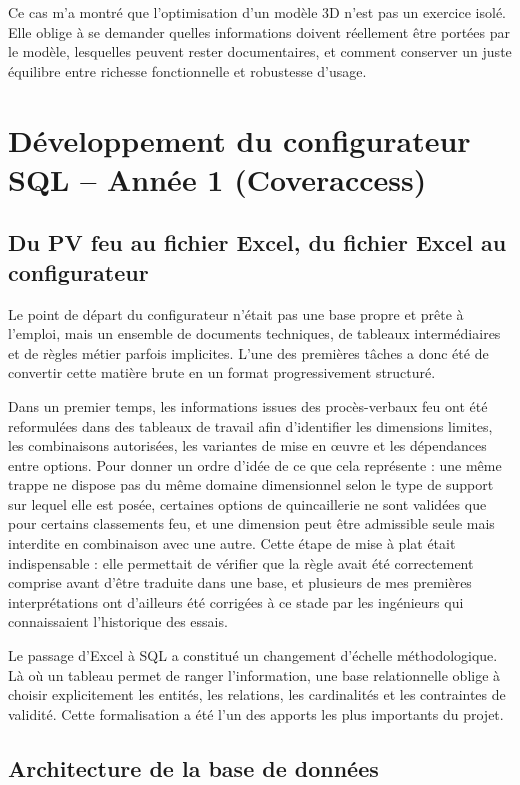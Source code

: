 Ce cas m'a montré que l'optimisation d'un modèle 3D n'est pas un exercice isolé. Elle oblige à se demander quelles informations doivent réellement être portées par le modèle, lesquelles peuvent rester documentaires, et comment conserver un juste équilibre entre richesse fonctionnelle et robustesse d'usage.

\section{Développement du configurateur SQL -- Année 1 (Coveraccess)}

\subsection{Du PV feu au fichier Excel, du fichier Excel au configurateur}

Le point de départ du configurateur n'était pas une base propre et prête à l'emploi, mais un ensemble de documents techniques, de tableaux intermédiaires et de règles métier parfois implicites. L'une des premières tâches a donc été de convertir cette matière brute en un format progressivement structuré.

Dans un premier temps, les informations issues des procès-verbaux feu ont été reformulées dans des tableaux de travail afin d'identifier les dimensions limites, les combinaisons autorisées, les variantes de mise en \oe uvre et les dépendances entre options. Pour donner un ordre d'idée de ce que cela représente : une même trappe ne dispose pas du même domaine dimensionnel selon le type de support sur lequel elle est posée, certaines options de quincaillerie ne sont validées que pour certains classements feu, et une dimension peut être admissible seule mais interdite en combinaison avec une autre. Cette étape de mise à plat était indispensable : elle permettait de vérifier que la règle avait été correctement comprise avant d'être traduite dans une base, et plusieurs de mes premières interprétations ont d'ailleurs été corrigées à ce stade par les ingénieurs qui connaissaient l'historique des essais.

Le passage d'Excel à SQL a constitué un changement d'échelle méthodologique. Là où un tableau permet de ranger l'information, une base relationnelle oblige à choisir explicitement les entités, les relations, les cardinalités et les contraintes de validité. Cette formalisation a été l'un des apports les plus importants du projet.

\subsection{Architecture de la base de données}

